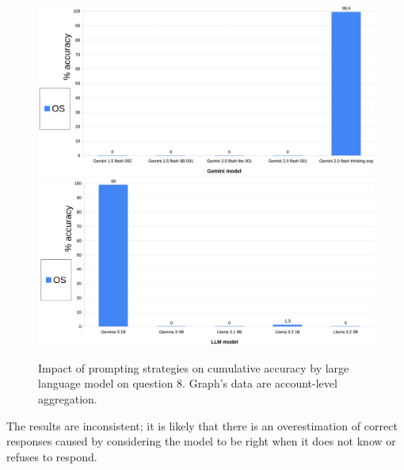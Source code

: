 \documentclass[12pt]{article}
\begin{document}
\vspace{2cm}


\begin{figure}[H]
    \centering
            \includegraphics[width=1\textwidth]{q202Gemini.png}
            \includegraphics[width=1\textwidth]{q202Other.png}
    \caption[Accuracy on Question 8 by LLM]{Impact of prompting strategies on cumulative accuracy by large language model on question 8. Graph's data are account-level aggregation.}
    \label{fig:33}
    \end{figure} 
The results are inconsistent; it is likely that there is an overestimation of correct responses caused by considering the model to be right when it does not know or refuses to respond.\\

\vspace{2cm}

\end{document}
